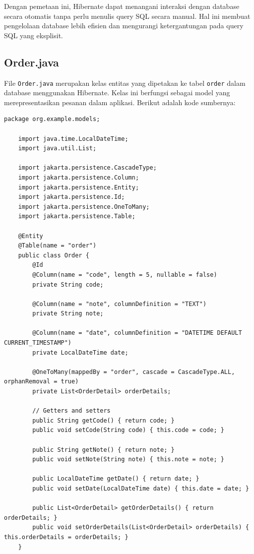 Dengan pemetaan ini, Hibernate dapat menangani interaksi dengan database secara otomatis tanpa perlu menulis query SQL secara manual. Hal ini membuat pengelolaan database lebih efisien dan mengurangi ketergantungan pada query SQL yang eksplisit.


\subsection{Order.java}

File \texttt{Order.java} merupakan kelas entitas yang dipetakan ke tabel \texttt{order} dalam database menggunakan Hibernate. Kelas ini berfungsi sebagai model yang merepresentasikan pesanan dalam aplikasi. Berikut adalah kode sumbernya:

\begin{lstlisting}[style=JavaStyle]
	package org.example.models;
	
	import java.time.LocalDateTime;
	import java.util.List;
	
	import jakarta.persistence.CascadeType;
	import jakarta.persistence.Column;
	import jakarta.persistence.Entity;
	import jakarta.persistence.Id;
	import jakarta.persistence.OneToMany;
	import jakarta.persistence.Table;
	
	@Entity
	@Table(name = "order")
	public class Order {
		@Id
		@Column(name = "code", length = 5, nullable = false)
		private String code;
		
		@Column(name = "note", columnDefinition = "TEXT")
		private String note;
		
		@Column(name = "date", columnDefinition = "DATETIME DEFAULT CURRENT_TIMESTAMP")
		private LocalDateTime date;
		
		@OneToMany(mappedBy = "order", cascade = CascadeType.ALL, orphanRemoval = true)
		private List<OrderDetail> orderDetails;
		
		// Getters and setters
		public String getCode() { return code; }
		public void setCode(String code) { this.code = code; }
		
		public String getNote() { return note; }
		public void setNote(String note) { this.note = note; }
		
		public LocalDateTime getDate() { return date; }
		public void setDate(LocalDateTime date) { this.date = date; }
		
		public List<OrderDetail> getOrderDetails() { return orderDetails; }
		public void setOrderDetails(List<OrderDetail> orderDetails) { this.orderDetails = orderDetails; }
	}
\end{lstlisting}

